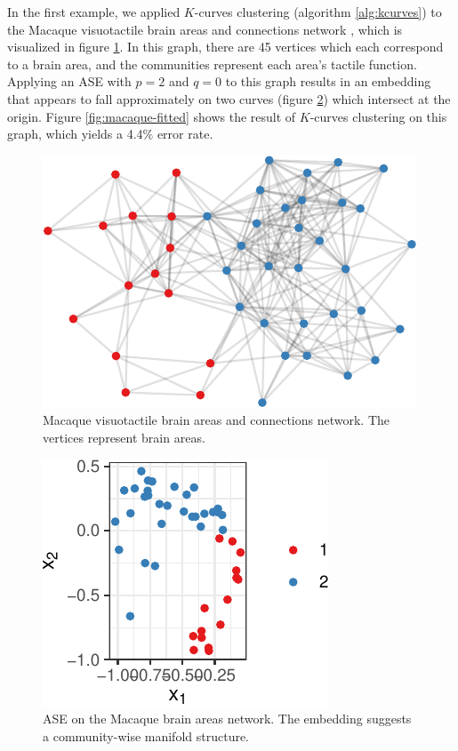 \documentclass[
  11pt,
]{article}
\theoremstyle{definition}
\theoremstyle{definition}
\theoremstyle{definition}
\theoremstyle{definition}
\theoremstyle{remark}
\begin{document}
In the first example, we applied \(K\)-curves clustering (algorithm \ref{alg:kcurves}) to the Macaque visuotactile brain areas and connections network \citep{https://doi.org/10.1111/j.1460-9568.2006.04678.x}, which is visualized in figure \ref{fig:macaque-graph}.
In this graph, there are 45 vertices which each correspond to a brain area, and the communities represent each area's tactile function.
Applying an ASE with \(p = 2\) and \(q = 0\) to this graph results in an embedding that appears to fall approximately on two curves (figure \ref{fig:macaque-ase}) which intersect at the origin.
Figure \ref{fig:macaque-fitted} shows the result of \(K\)-curves clustering on this graph,
which yields a 4.4\% error rate.

\begin{figure}[H]

{\centering \includegraphics{draft_files/figure-latex/macaque-graph-1} 

}

\caption{Macaque visuotactile brain areas and connections network. The vertices represent brain areas.}\label{fig:macaque-graph}
\end{figure}

\begin{figure}[H]

{\centering \includegraphics{draft_files/figure-latex/macaque-ase-1} 

}

\caption{ASE on the Macaque brain areas network. The embedding suggests a community-wise manifold structure.}\label{fig:macaque-ase}
\end{figure}
\end{document}
